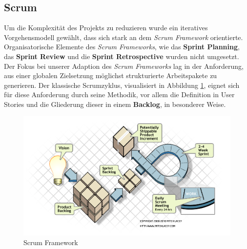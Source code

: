 \subsection{Scrum}
Um die Komplexität des Projekts zu reduzieren wurde ein iteratives Vorgehensmodell gewählt, dass sich stark an dem \textit{Scrum Framework}
orientierte. Organisatorische Elemente des \textit{Scrum Frameworks}, wie das \textbf{Sprint Planning}, das \textbf{Sprint Review} und die
\textbf{Sprint Retrospective} wurden nicht umgesetzt. Der Fokus bei unserer Adaption des \textit{Scrum Frameworks} lag in der Anforderung, aus einer
globalen Zielsetzung möglichst strukturierte Arbeitspakete zu generieren. Der klassische Scrumzyklus, visualisiert in Abbildung \ref{ScrumFramework},
eignet sich für diese Anforderung durch seine Methodik, vor allem die Definition in User Stories und die Gliederung dieser in einem
\textbf{Backlog}, in besonderer Weise.\\

\begin{figure}[htp]
	\includegraphics[width=\textwidth]{ScrumFrameworkFlow}
	\caption{Scrum Framework}
	\label{ScrumFramework}
\end{figure}

